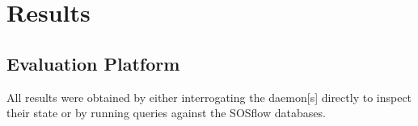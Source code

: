 
\section{Results} %
\subsection{Evaluation Platform} %
All results were obtained by either interrogating the daemon[s] directly
to inspect their state or by running queries against the SOSflow
databases.
%

%
%
%


